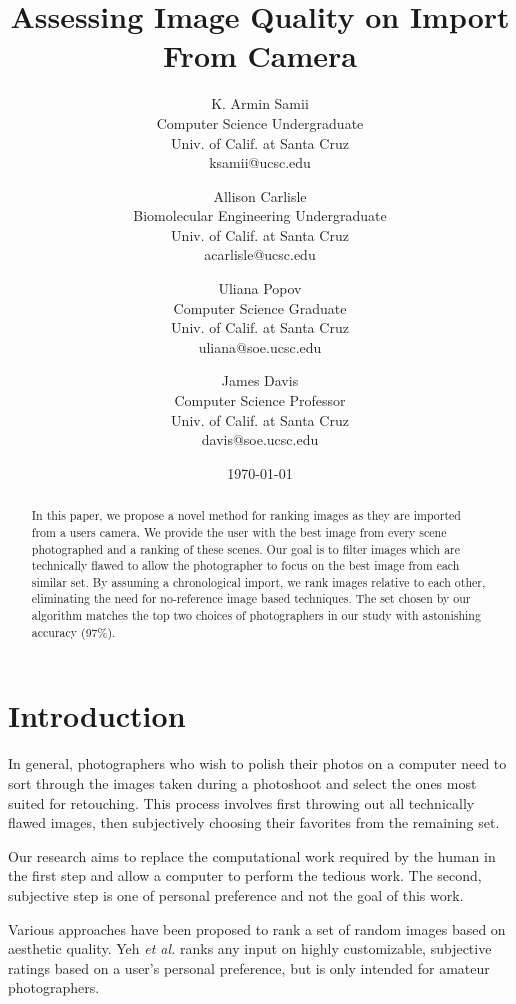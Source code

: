 \documentclass[twocolumn]{article}
\title{
   Assessing Image Quality on Import From Camera
} %
\author{
   K. Armin Samii\\
   Computer Science Undergraduate\\
   Univ. of Calif. at Santa Cruz\\
   ksamii@ucsc.edu
  \and
   Allison Carlisle\\
   Biomolecular Engineering Undergraduate\\
   Univ. of Calif. at Santa Cruz\\
   acarlisle@ucsc.edu
  \and
   Uliana Popov\\
   Computer Science Graduate\\
   Univ. of Calif. at Santa Cruz\\
   uliana@soe.ucsc.edu
  \and
   James Davis\\
   Computer Science Professor\\
   Univ. of Calif. at Santa Cruz\\
   davis@soe.ucsc.edu
}
\date{\today}
\begin{document}
\maketitle

\begin{abstract}
In this paper, we propose a novel method for ranking images as they are imported from a users camera. We provide the user with the best image from every scene photographed and a ranking of these scenes. Our goal is to filter images which are technically flawed to allow the photographer to focus on the best image from each similar set. By assuming a chronological import, we rank images relative to each other, eliminating the need for no-reference image based techniques. The set chosen by our algorithm matches the top two choices of photographers in our study with astonishing accuracy (97\%).
\end{abstract}

\section{Introduction}
In general, photographers who wish to polish their photos on a computer need to sort through the images taken during a photoshoot and select the ones most suited for retouching. This process involves first throwing out all technically flawed images, then subjectively choosing their favorites from the remaining set.

Our research aims to replace the computational work required by the human in the first step and allow a computer to perform the tedious work. The second, subjective step is one of personal preference and not the goal of this work.

Various approaches have been proposed to rank a set of random images based on aesthetic quality. Yeh \textit{et al.}\cite{Yeh:2010:PPR:1873951.1873963} ranks any input on highly customizable, subjective ratings based on a user's personal preference, but is only intended for amateur photographers. 



\end{document}
